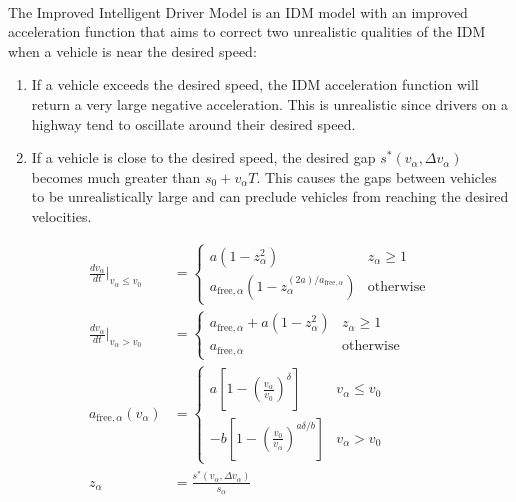 \documentclass[12pt]{article}
\begin{document}
\paragraph{}
The Improved Intelligent Driver Model is an IDM model with an improved acceleration function that aims to correct two unrealistic qualities of the IDM when a vehicle is near the desired speed:
\begin{enumerate}
  \item 
  If a vehicle exceeds the desired speed, the IDM acceleration function will return a very large negative acceleration.  This is unrealistic since drivers on a highway tend to oscillate around their desired speed.  
  \item
  If a vehicle is close to the desired speed, the desired gap $s^*(v_\alpha,\Delta v_\alpha)$ becomes much greater than $s_0 + v_\alpha T$.  This causes the gaps between vehicles to be unrealistically large and can preclude vehicles from reaching the desired velocities.
\end{enumerate}
\begin{mymathbox}[ams gather, title=IIDM Governing Functions, colframe=blue!30!black]
  \begin{align}
  \frac{dv_\alpha}{dt}\Bigr|_{v_\alpha\le v_0}&= 
  \begin{cases}
    a (1-z_\alpha^2) & z_\alpha \ge 1\\
   a_{\text{free},\alpha}(1 - z_\alpha^{(2a)/a_{\text{free},\alpha}})& \text{otherwise}
  \end{cases}
  \\
  \frac{dv_\alpha}{dt}\Bigr|_{v_\alpha> v_0}&= 
  \begin{cases}
    a_{\text{free},\alpha} + a (1-z_\alpha^2) & z_\alpha \ge 1\\
    a_{\text{free},\alpha} & \text{otherwise}
  \end{cases}\\
  a_{\text{free},\alpha}(v_\alpha)&= \begin{cases}
  a \left[ 1 - (\frac{v_\alpha}{v_0})^\delta \right] & v_\alpha \le v_0\\
  -b \left[ 1 - (\frac{v_0}{v_\alpha})^{a\delta/b} \right] & v_\alpha > v_0
  \end{cases}\\
  z_\alpha&= \frac{s^*(v_\alpha, \Delta v_\alpha)}{s_\alpha}
  \end{align}
\end{mymathbox}
\end{document}
